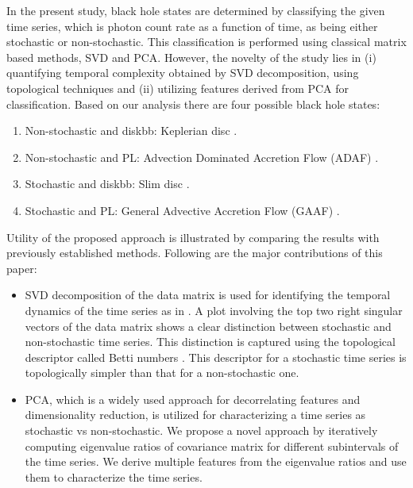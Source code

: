 \documentclass[10pt,conference]{IEEEtran}
\begin{document}
In the present study, black hole states are determined by  classifying the given time series, which is photon count rate as a function of time,  as being either stochastic or non-stochastic. This classification is performed using classical matrix based methods, SVD and PCA.
However, the novelty of the study lies in (i) quantifying temporal complexity obtained by SVD decomposition, using topological techniques and (ii) utilizing features derived from PCA for classification. Based on our analysis there are four possible black hole states:
\begin{enumerate}
\item Non-stochastic and diskbb: Keplerian disc \cite{Shakura1973}.
\item Non-stochastic and PL: Advection Dominated Accretion Flow (ADAF)  \cite{narayan1994}.
\item Stochastic and diskbb: Slim disc \cite{Abramowicz1988}.
\item Stochastic and PL: General Advective Accretion Flow (GAAF) \cite{chakrabarti1995, rajesh2010}.
\end{enumerate}

Utility of the proposed approach is illustrated by comparing the results with previously established methods. Following are the major contributions of this paper:
\begin{itemize}
\item SVD decomposition of the data matrix is used for identifying the temporal dynamics of the time series as in \cite{misra2006}. A plot involving the top two right singular vectors of the data matrix shows a clear distinction between stochastic and non-stochastic time series. This distinction is captured using the topological descriptor called Betti numbers \cite{jmlr}. This descriptor for a stochastic time series is topologically simpler than that for a non-stochastic one.

\item PCA, which is a widely used approach for decorrelating features and dimensionality reduction, is utilized for characterizing a time series as stochastic vs non-stochastic. We propose a novel approach by iteratively computing eigenvalue ratios  of covariance matrix for different subintervals of the time series. We  derive multiple features from the eigenvalue ratios and use them to characterize the time series.
\end{itemize}
\end{document}
